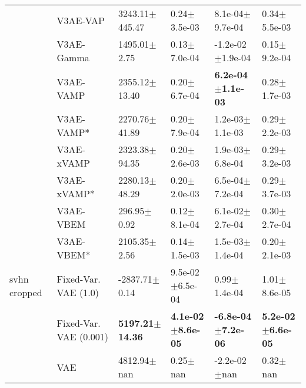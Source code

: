 \begin{tabular}{llllll}
             & V3AE-VAP &           3243.11$\pm$445.47 &              0.24$\pm$3.5e-03 &            8.1e-04$\pm$9.7e-04 &              0.34$\pm$5.5e-03 \\
             & V3AE-Gamma &             1495.01$\pm$2.75 &              0.13$\pm$7.0e-04 &           -1.2e-02$\pm$1.9e-04 &              0.15$\pm$9.2e-04 \\
             & V3AE-VAMP &            2355.12$\pm$13.40 &              0.20$\pm$6.7e-04 &   \textbf{6.2e-04$\pm$1.1e-03} &              0.28$\pm$1.7e-03 \\
             & V3AE-VAMP* &            2270.76$\pm$41.89 &              0.20$\pm$7.9e-04 &            1.2e-03$\pm$1.1e-03 &              0.29$\pm$2.2e-03 \\
             & V3AE-xVAMP &            2323.38$\pm$94.35 &              0.20$\pm$2.6e-03 &            1.9e-03$\pm$6.8e-04 &              0.29$\pm$3.2e-03 \\
             & V3AE-xVAMP* &            2280.13$\pm$48.29 &              0.20$\pm$2.0e-03 &            6.5e-04$\pm$7.2e-04 &              0.29$\pm$3.7e-03 \\
             & V3AE-VBEM &              296.95$\pm$0.92 &              0.12$\pm$8.1e-04 &            6.1e-02$\pm$2.7e-04 &              0.30$\pm$2.7e-04 \\
             & V3AE-VBEM* &             2105.35$\pm$2.56 &              0.14$\pm$1.5e-03 &            1.5e-03$\pm$1.4e-04 &              0.20$\pm$2.1e-03 \\
svhn cropped & Fixed-Var. VAE (1.0) &            -2837.71$\pm$0.14 &           9.5e-02$\pm$6.5e-04 &               0.99$\pm$1.4e-04 &              1.01$\pm$8.6e-05 \\
             & Fixed-Var. VAE (0.001) &   \textbf{5197.21$\pm$14.36} &  \textbf{4.1e-02$\pm$8.6e-05} &  \textbf{-6.8e-04$\pm$7.2e-06} &  \textbf{5.2e-02$\pm$6.6e-05} \\
             & VAE &              4812.94$\pm$nan &                  0.25$\pm$nan &               -2.2e-02$\pm$nan &                  0.32$\pm$nan \\
\bottomrule
\end{tabular}

